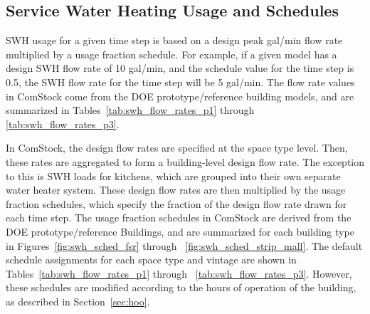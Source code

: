\subsection{Service Water Heating Usage and Schedules}

SWH usage for a given time step is based on a design peak gal/min flow rate multiplied by a usage fraction schedule. For example, if a given model has a design SWH flow rate of 10 gal/min, and the schedule value for the time step is 0.5, the SWH flow rate for the time step will be 5 gal/min. The flow rate values in ComStock come from the DOE prototype/reference building models, and are summarized in Tables~\ref{tab:swh_flow_rates_p1} through \ref{tab:swh_flow_rates_p3}.

In ComStock, the design flow rates are specified at the space type level. Then, these rates are aggregated to form a building-level design flow rate. The exception to this is SWH loads for kitchens, which are grouped into their own separate water heater system. These design flow rates are then multiplied by the usage fraction schedules, which specify the fraction of the design flow rate drawn for each time step. The usage fraction schedules in ComStock are derived from the DOE prototype/reference Buildings, and are summarized for each building type in Figures~\ref{fig:swh_sched_fsr} through ~\ref{fig:swh_sched_strip_mall}. The default schedule assignments for each space type and vintage are shown in Tables~\ref{tab:swh_flow_rates_p1} through ~\ref{tab:swh_flow_rates_p3}. However, these schedules are modified according to the hours of operation of the building, as described in Section~\ref{sec:hoo}. 






